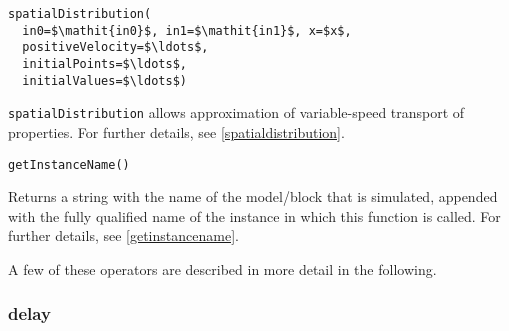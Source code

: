 \begin{operatordefinition}[spatialDistribution]
\begin{synopsis}\begin{lstlisting}
spatialDistribution(
  in0=$\mathit{in0}$, in1=$\mathit{in1}$, x=$x$,
  positiveVelocity=$\ldots$,
  initialPoints=$\ldots$,
  initialValues=$\ldots$)
\end{lstlisting}\end{synopsis}
\begin{semantics}
\lstinline!spatialDistribution! allows approximation of variable-speed transport of properties.  For further details, see \cref{spatialdistribution}.
\end{semantics}
\end{operatordefinition}

\begin{operatordefinition}[getInstanceName]
\begin{synopsis}\begin{lstlisting}
getInstanceName()
\end{lstlisting}\end{synopsis}
\begin{semantics}
Returns a string with the name of the model/block that is simulated, appended with the fully qualified name of the instance in which this function is called.  For further details, see \cref{getinstancename}.
\end{semantics}
\end{operatordefinition}

A few of these operators are described in more detail in the following.

\subsubsection{delay}\label{delay}

